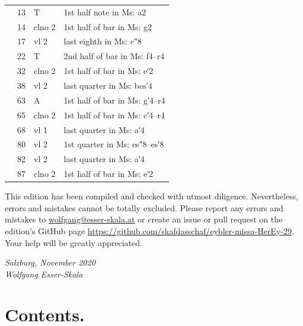 \documentclass[parskip=full]{scrreprt}
\newif\iftemplate\templatetrue
\begin{document}
\begin{longtable}{lll L{10cm}}
	  & 13  & T       & 1st half note in Ms: a2 \\
	  & 14  & clno 2  & 1st half of bar in Ms: g2 \\
	  & 17  & vl 2    & last eighth in Ms: c″8 \\
	  & 22  & T       & 2nd half of bar in Ms: f4–r4 \\
	  & 32  & clno 2  & 1st half of bar in Ms: e′2 \\
	  & 38  & vl 2    & last quarter in Ms: bes′4 \\
	  & 63  & A       & 1st half of bar in Ms: g′4–r4 \\
	  & 65  & clno 2  & 1st half of bar in Ms: c′4–r4 \\
	  & 68  & vl 1    & last quarter in Ms: a′4 \\
	  & 80  & vl 2    & 1st quarter in Ms: es″8–es′8 \\
	  & 82  & vl 2    & last quarter in Ms: a′4 \\
	  & 87  & clno 2  & 1st half of bar in Ms: e′2 \\
	\bottomrule
\end{longtable}


This edition has been compiled and checked with utmost diligence. Nevertheless, errors and mistakes cannot be totally excluded. Please report any errors and mistakes to \url{wolfgang@esser-skala.at} or create an issue or pull request on the edition’s GitHub page \url{https://github.com/skafdasschaf/eybler-missa-HerEy-29}. Your help will be greatly appreciated.

\bigskip
\textit{Salzburg, November 2020\\
Wolfgang Esser-Skala}

\cleardoublepage
\chapter*{Contents.}


\cleardoublepage
\fi

\iftemplate

\fi
\end{document}
